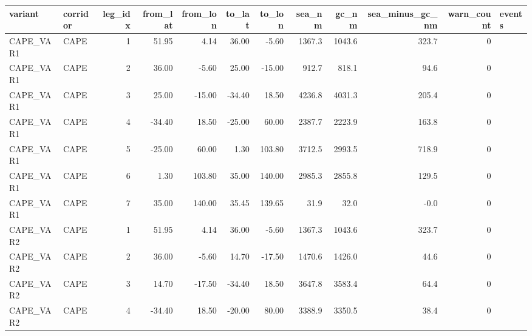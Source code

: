 \begin{tabular}{llrrrrrrrrrl}
\toprule
  variant & corridor &  leg\_idx &  from\_lat &  from\_lon &  to\_lat &  to\_lon &  sea\_nm &  gc\_nm &  sea\_minus\_gc\_nm &  warn\_count &                                             events \\
\midrule
CAPE\_VAR1 &     CAPE &        1 &     51.95 &      4.14 &   36.00 &   -5.60 &  1367.3 & 1043.6 &            323.7 &           0 &                                                    \\
CAPE\_VAR1 &     CAPE &        2 &     36.00 &     -5.60 &   25.00 &  -15.00 &   912.7 &  818.1 &             94.6 &           0 &                                                    \\
CAPE\_VAR1 &     CAPE &        3 &     25.00 &    -15.00 &  -34.40 &   18.50 &  4236.8 & 4031.3 &            205.4 &           0 &                                                    \\
CAPE\_VAR1 &     CAPE &        4 &    -34.40 &     18.50 &  -25.00 &   60.00 &  2387.7 & 2223.9 &            163.8 &           0 &                                                    \\
CAPE\_VAR1 &     CAPE &        5 &    -25.00 &     60.00 &    1.30 &  103.80 &  3712.5 & 2993.5 &            718.9 &           0 &                                                    \\
CAPE\_VAR1 &     CAPE &        6 &      1.30 &    103.80 &   35.00 &  140.00 &  2985.3 & 2855.8 &            129.5 &           0 &                                                    \\
CAPE\_VAR1 &     CAPE &        7 &     35.00 &    140.00 &   35.45 &  139.65 &    31.9 &   32.0 &             -0.0 &           0 &                                                    \\
CAPE\_VAR2 &     CAPE &        1 &     51.95 &      4.14 &   36.00 &   -5.60 &  1367.3 & 1043.6 &            323.7 &           0 &                                                    \\
CAPE\_VAR2 &     CAPE &        2 &     36.00 &     -5.60 &   14.70 &  -17.50 &  1470.6 & 1426.0 &             44.6 &           0 &                                                    \\
CAPE\_VAR2 &     CAPE &        3 &     14.70 &    -17.50 &  -34.40 &   18.50 &  3647.8 & 3583.4 &             64.4 &           0 &                                                    \\
CAPE\_VAR2 &     CAPE &        4 &    -34.40 &     18.50 &  -20.00 &   80.00 &  3388.9 & 3350.5 &             38.4 &           0 &                                                    \\

\end{tabular}
